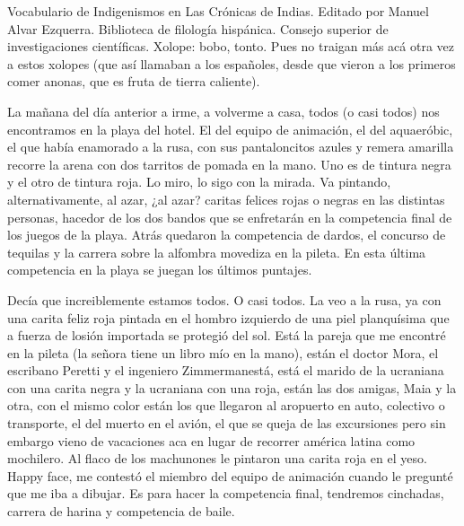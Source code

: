 \documentclass[12pt,twoside,openright,a5paper]{book}
\begin{document}
\vspace{0.5cm}
\hrulefill\hspace{0.2cm} \decofourleft\decofourright \hspace{0.2cm} \hrulefill
\vspace{0.5cm}

Vocabulario de Indigenismos en Las Crónicas de Indias. Editado por  Manuel
Alvar Ezquerra. Biblioteca de filología hispánica. Consejo superior de
investigaciones científicas. Xolope: bobo, tonto. Pues no traigan más
acá otra vez a estos xolopes (que así llamaban a los españoles, desde
que vieron a los primeros comer anonas, que es fruta de tierra caliente).


\vspace{0.5cm}
\hrulefill\hspace{0.2cm} \decofourleft\decofourright \hspace{0.2cm} \hrulefill
\vspace{0.5cm}

La mañana del día anterior a irme, a volverme a casa, todos (o casi todos)
nos encontramos en la playa del hotel. El del equipo de animación, el
del aquaeróbic, el que había enamorado a la rusa, con sus pantaloncitos
azules y remera amarilla recorre la arena con dos tarritos de pomada en la
mano. Uno es de tintura negra y el otro de tintura roja. Lo miro, lo sigo
con la mirada. Va pintando, alternativamente, al azar, ¿al azar? caritas
felices rojas o negras en las distintas personas, hacedor de los dos bandos
que se enfretarán en la competencia final de los juegos de la playa. Atrás
quedaron la competencia de dardos, el concurso de tequilas y la carrera
sobre la alfombra movediza en la pileta. En esta última competencia en la
playa se juegan los últimos puntajes.

Decía que increiblemente estamos todos. O casi todos. La veo a la rusa,
ya con una carita feliz roja pintada en el hombro izquierdo de una piel
planquísima que a fuerza de losión importada se protegió del sol. Está
la pareja que me encontré en la pileta (la señora tiene un libro mío
en la mano), están el doctor Mora, el escribano Peretti y el ingeniero
Zimmermanestá, está el marido de la ucraniana con una carita negra y la
ucraniana con una roja, están las dos amigas, Maia y la otra, con el mismo
color están los que llegaron al aropuerto en auto, colectivo o transporte,
el del muerto en el avión, el que se queja de las excursiones pero sin
embargo vieno de vacaciones aca en lugar de recorrer américa latina como
mochilero. Al flaco de los machunones le pintaron una carita roja en el
yeso. Happy face, me contestó el miembro del equipo de animación cuando
le pregunté que me iba a dibujar. Es para hacer la competencia final,
tendremos cinchadas, carrera de harina y competencia de baile.
\end{document}
